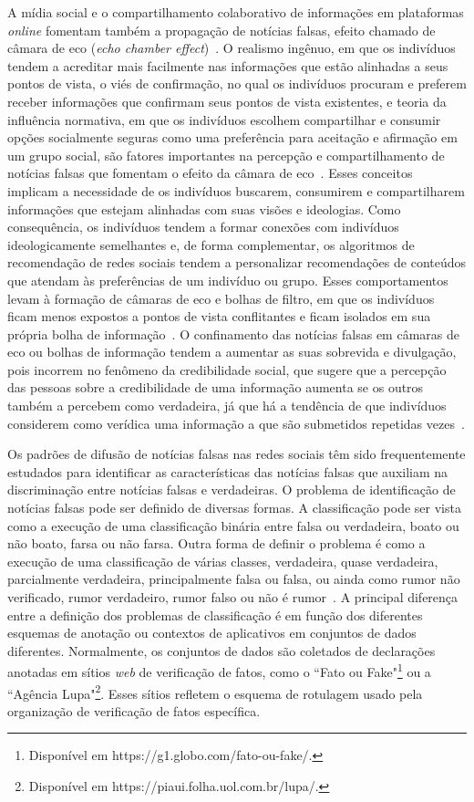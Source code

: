 \documentclass{SBCbookchapter}
\begin{document}
A mídia social e o compartilhamento colaborativo de informações em plataformas \textit{online} fomentam também a propagação de notícias falsas, efeito chamado de câmara de eco (\textit{echo chamber effect})~\cite{shu2020fakenewsnet}.  O realismo ingênuo, em que os indivíduos tendem a acreditar mais facilmente nas informações que estão alinhadas a seus pontos de vista, o viés de confirmação, no qual os indivíduos procuram e preferem receber informações que confirmam seus pontos de vista existentes, e teoria da influência normativa, em que os indivíduos escolhem compartilhar e consumir opções socialmente seguras como uma preferência para aceitação e afirmação em um grupo social, são fatores importantes na percepção e compartilhamento de notícias falsas que fomentam o efeito da câmara de eco~\cite{shu2020fakenewsnet}. Esses conceitos implicam a necessidade de os indivíduos buscarem, consumirem e compartilharem informações que estejam alinhadas com suas visões e ideologias. Como consequência, os indivíduos tendem a formar conexões com indivíduos ideologicamente semelhantes e, de forma complementar, os algoritmos de recomendação de redes sociais tendem a personalizar recomendações de conteúdos que atendam às preferências de um indivíduo ou grupo. Esses comportamentos levam à formação de câmaras de eco e bolhas de filtro, em que os indivíduos ficam menos expostos a pontos de vista conflitantes e ficam isolados em sua própria bolha de informação~\cite{fuller2009, sharma2019combating}. O confinamento das notícias falsas em câmaras de eco ou bolhas de informação tendem a aumentar as suas sobrevida e divulgação, pois incorrem no fenômeno da credibilidade social, que sugere que a percepção das pessoas sobre a credibilidade de uma informação aumenta se os outros também a percebem como verdadeira, já que há a tendência de que indivíduos considerem como verídica uma informação a que são submetidos repetidas vezes~\cite{rubin2016fake}.

Os padrões de difusão de notícias falsas nas redes sociais têm sido frequentemente estudados para identificar as características das notícias falsas que auxiliam na discriminação entre notícias falsas e verdadeiras. O problema de identificação de notícias falsas pode ser definido de diversas formas. A classificação pode ser vista como a execução de uma classificação binária entre falsa ou verdadeira, boato ou não boato, farsa ou não farsa. Outra forma de definir o problema é como a execução de uma classificação de várias classes, verdadeira, quase verdadeira, parcialmente verdadeira, principalmente falsa ou falsa, ou ainda como rumor não verificado, rumor verdadeiro, rumor falso ou não é rumor~\cite{sharma2019fake}. A principal diferença entre a definição dos problemas de classificação é em função dos diferentes esquemas de anotação ou contextos de aplicativos em conjuntos de dados diferentes. Normalmente, os conjuntos de dados são coletados de declarações anotadas em sítios \textit{web} de verificação de fatos, como o ``Fato ou Fake"\footnote{Disponível em https://g1.globo.com/fato-ou-fake/.} ou a ``Agência Lupa"\footnote{Disponível em https://piaui.folha.uol.com.br/lupa/.}. Esses sítios refletem o esquema de rotulagem usado pela organização de verificação de fatos específica. 
\end{document}
